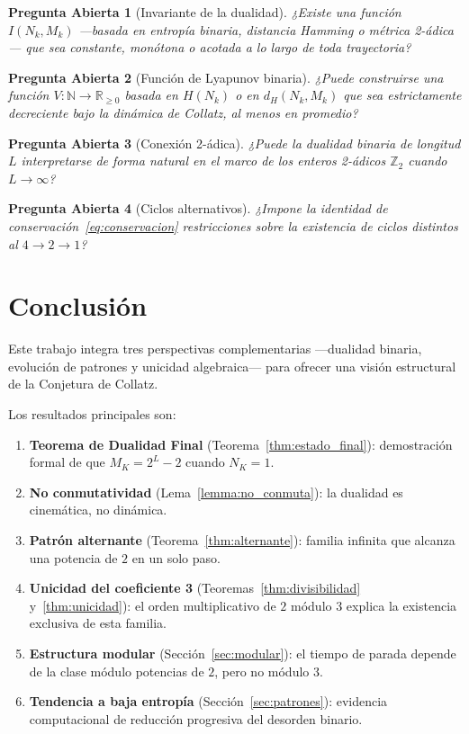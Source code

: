 \documentclass[11pt,a4paper]{article}
\newtheorem{question}{Pregunta Abierta}
\begin{document}
\begin{question}[Invariante de la dualidad]
¿Existe una función $I(N_k, M_k)$ —basada en entropía binaria,
distancia Hamming o métrica 2-ádica— que sea constante, monótona
o acotada a lo largo de toda trayectoria?
\end{question}

\begin{question}[Función de Lyapunov binaria]
¿Puede construirse una función $V: \mathbb{N} \to \mathbb{R}_{\ge 0}$
basada en $H(N_k)$ o en $d_H(N_k, M_k)$ que sea estrictamente
decreciente bajo la dinámica de Collatz, al menos en promedio?
\end{question}

\begin{question}[Conexión 2-ádica]
¿Puede la dualidad binaria de longitud $L$ interpretarse de forma natural
en el marco de los enteros 2-ádicos $\mathbb{Z}_2$
cuando $L \to \infty$?
\end{question}

\begin{question}[Ciclos alternativos]
¿Impone la identidad de conservación~\eqref{eq:conservacion}
restricciones sobre la existencia de ciclos distintos al $4{\to}2{\to}1$?
\end{question}

\section{Conclusión}
\label{sec:conclusion}

Este trabajo integra tres perspectivas complementarias
—dualidad binaria, evolución de patrones y unicidad algebraica—
para ofrecer una visión estructural de la Conjetura de Collatz.

Los resultados principales son:
\begin{enumerate}
  \item \textbf{Teorema de Dualidad Final} (Teorema~\ref{thm:estado_final}):
        demostración formal de que $M_K = 2^L - 2$ cuando $N_K = 1$.
  \item \textbf{No conmutatividad} (Lema~\ref{lemma:no_conmuta}):
        la dualidad es cinemática, no dinámica.
  \item \textbf{Patrón alternante} (Teorema~\ref{thm:alternante}):
        familia infinita que alcanza una potencia de $2$ en un solo paso.
  \item \textbf{Unicidad del coeficiente 3}
        (Teoremas~\ref{thm:divisibilidad} y~\ref{thm:unicidad}):
        el orden multiplicativo de $2$ módulo $3$ explica la existencia
        exclusiva de esta familia.
  \item \textbf{Estructura modular} (Sección~\ref{sec:modular}):
        el tiempo de parada depende de la clase módulo potencias de $2$,
        pero no módulo $3$.
  \item \textbf{Tendencia a baja entropía} (Sección~\ref{sec:patrones}):
        evidencia computacional de reducción progresiva del desorden binario.
\end{enumerate}
\end{document}
